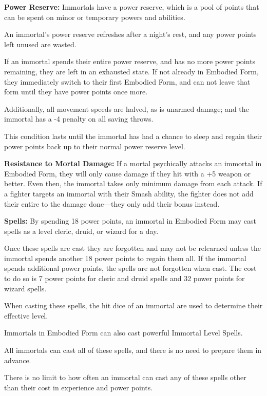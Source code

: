 \begin{multicols*}{2}
\textbf{Power Reserve:} Immortals have a power reserve, which is a pool of points that can be spent on minor or temporary powers and abilities.

An immortal’s power reserve refreshes after a night’s rest, and any power points left unused are wasted.

If an immortal spends their entire power reserve, and has no more power points remaining, they are left in an exhausted state. If not already in Embodied Form, they immediately switch to their first Embodied Form, and can not leave that form until they have power points once more.

Additionally, all movement speeds are halved, as is unarmed damage; and the immortal has a -4 penalty on all saving throws.

This condition lasts until the immortal has had a chance to sleep and regain their power points back up to their normal power reserve level.

\textbf{Resistance to Mortal Damage:} If a mortal psychically attacks an immortal in Embodied Form, they will only cause damage if they hit with a +5 weapon or better. Even then, the immortal takes only minimum damage from each attack. If a fighter targets an immortal with their Smash ability, the fighter does not add their entire  to the damage done—they only add their  bonus instead.

\textbf{Spells:} By spending 18 power points, an immortal in Embodied Form may cast spells as a  level cleric, druid, or wizard for a day.

Once these spells are cast they are forgotten and may not be relearned unless the immortal spends another 18 power points to regain them all. If the immortal spends additional power points, the spells are not forgotten when cast. The cost to do so is 7 power points for cleric and druid spells and 32 power points for wizard spells.

When casting these spells, the hit dice of an immortal are used to determine their effective level.

Immortals in Embodied Form can also cast powerful Immortal Level Spells.

All immortals can cast all of these spells, and there is no need to prepare them in advance.

There is no limit to how often an immortal can cast any of these spells other than their cost in experience and power points.


\end{multicols*}
